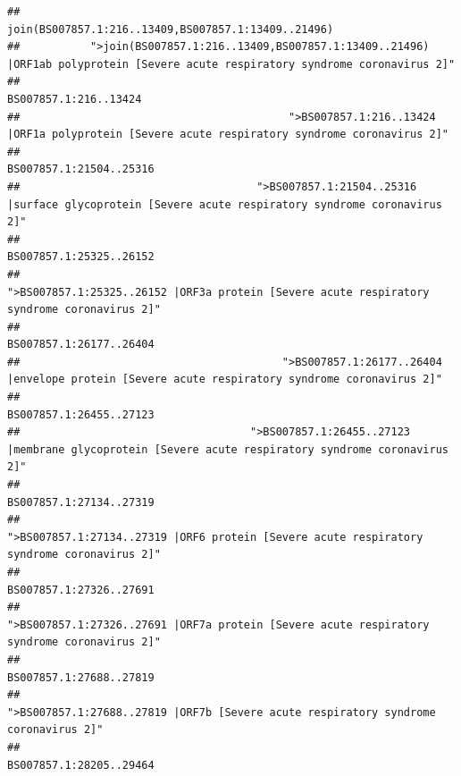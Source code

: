 \documentclass[
]{article}
\begin{document}
\begin{verbatim}
##                                                                                    join(BS007857.1:216..13409,BS007857.1:13409..21496) 
##           ">join(BS007857.1:216..13409,BS007857.1:13409..21496) |ORF1ab polyprotein [Severe acute respiratory syndrome coronavirus 2]" 
##                                                                                                                  BS007857.1:216..13424 
##                                          ">BS007857.1:216..13424 |ORF1a polyprotein [Severe acute respiratory syndrome coronavirus 2]" 
##                                                                                                                BS007857.1:21504..25316 
##                                     ">BS007857.1:21504..25316 |surface glycoprotein [Severe acute respiratory syndrome coronavirus 2]" 
##                                                                                                                BS007857.1:25325..26152 
##                                            ">BS007857.1:25325..26152 |ORF3a protein [Severe acute respiratory syndrome coronavirus 2]" 
##                                                                                                                BS007857.1:26177..26404 
##                                         ">BS007857.1:26177..26404 |envelope protein [Severe acute respiratory syndrome coronavirus 2]" 
##                                                                                                                BS007857.1:26455..27123 
##                                    ">BS007857.1:26455..27123 |membrane glycoprotein [Severe acute respiratory syndrome coronavirus 2]" 
##                                                                                                                BS007857.1:27134..27319 
##                                             ">BS007857.1:27134..27319 |ORF6 protein [Severe acute respiratory syndrome coronavirus 2]" 
##                                                                                                                BS007857.1:27326..27691 
##                                            ">BS007857.1:27326..27691 |ORF7a protein [Severe acute respiratory syndrome coronavirus 2]" 
##                                                                                                                BS007857.1:27688..27819 
##                                                    ">BS007857.1:27688..27819 |ORF7b [Severe acute respiratory syndrome coronavirus 2]" 
##                                                                                                                BS007857.1:28205..29464 

\end{verbatim}
\end{document}
